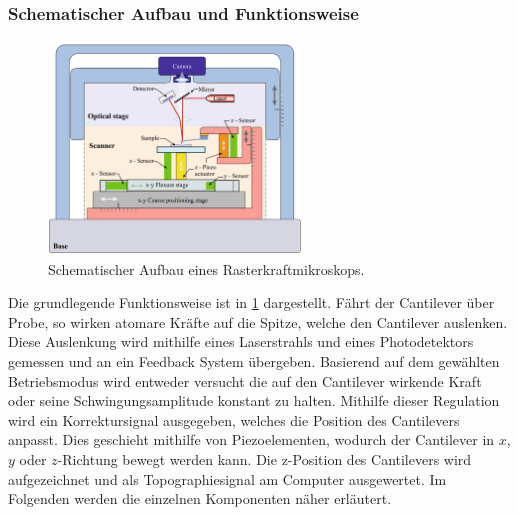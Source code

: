 \subsubsection{Schematischer Aufbau und Funktionsweise}
\begin{figure}
    \centering
    \includegraphics[width=0.6\textwidth]{../assets/messmethoden/afm/01_aufbau}
    \caption{Schematischer Aufbau eines Rasterkraftmikroskops. }
    \label{fig:afm_aufbau}
\end{figure}

Die grundlegende Funktionsweise ist in \cref{fig:afm_aufbau} dargestellt.
Fährt der Cantilever über Probe, so wirken atomare Kräfte auf die Spitze, welche den Cantilever auslenken.
Diese Auslenkung wird mithilfe eines Laserstrahls und eines Photodetektors gemessen und an ein Feedback System
übergeben.
Basierend auf dem gewählten Betriebsmodus wird entweder versucht die auf den Cantilever wirkende Kraft oder seine
Schwingungsamplitude konstant zu halten.
Mithilfe dieser Regulation wird ein Korrektursignal ausgegeben, welches die Position des Cantilevers anpasst.
Dies geschieht mithilfe von Piezoelementen, wodurch der Cantilever in $x$, $y$ oder $z$-Richtung bewegt werden kann.
Die z-Position des Cantilevers wird aufgezeichnet und als Topographiesignal am Computer ausgewertet.
Im Folgenden werden die einzelnen Komponenten näher erläutert.\autocite{afm-buch}

